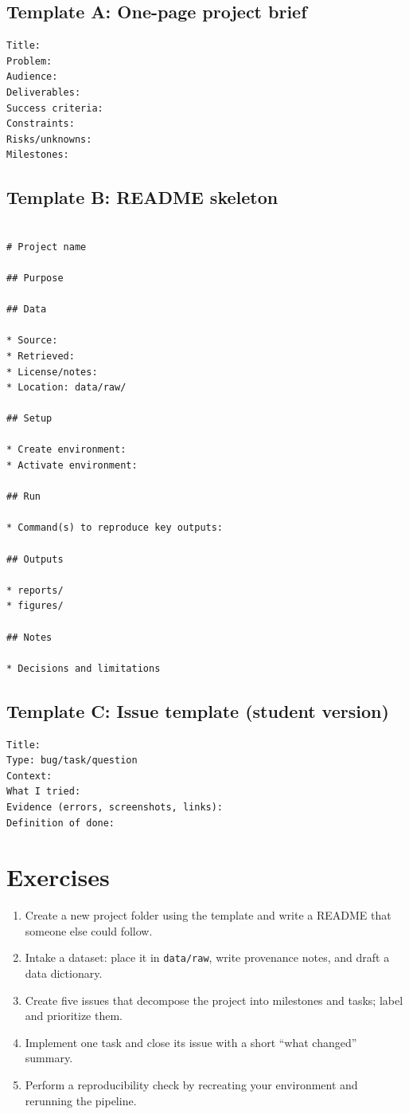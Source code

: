 \subsection{Template A: One-page project brief}
\begin{verbatim}
Title:
Problem:
Audience:
Deliverables:
Success criteria:
Constraints:
Risks/unknowns:
Milestones:
\end{verbatim}

\subsection{Template B: README skeleton}
\begin{verbatim}

# Project name

## Purpose

## Data

* Source:
* Retrieved:
* License/notes:
* Location: data/raw/

## Setup

* Create environment:
* Activate environment:

## Run

* Command(s) to reproduce key outputs:

## Outputs

* reports/
* figures/

## Notes

* Decisions and limitations
  \end{verbatim}

\subsection{Template C: Issue template (student version)}
\begin{verbatim}
Title:
Type: bug/task/question
Context:
What I tried:
Evidence (errors, screenshots, links):
Definition of done:
\end{verbatim}

\section{Exercises}
\begin{enumerate}
\item Create a new project folder using the template and write a README that someone else could follow.
\item Intake a dataset: place it in \texttt{data/raw}, write provenance notes, and draft a data dictionary.
\item Create five issues that decompose the project into milestones and tasks; label and prioritize them.
\item Implement one task and close its issue with a short ``what changed'' summary.
\item Perform a reproducibility check by recreating your environment and rerunning the pipeline.
\end{enumerate}

